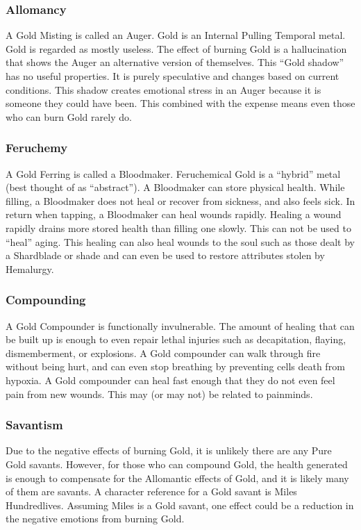 \documentclass[conference]{IEEEtran}
\begin{document}
\subsubsection*{\textbf{Allomancy}}
A Gold Misting is called an Auger.\cite{ARS}  Gold is an Internal Pulling Temporal metal.\cite{AL-TB}  Gold is regarded as mostly useless.  The effect of burning Gold is a hallucination that shows the Auger an alternative version of themselves.\cite{ARS}  This ``Gold shadow'' has no useful properties.  It is purely speculative and changes based on current conditions.\cite{gd-situation}  This shadow creates emotional stress in an Auger because it is someone they could have been.\cite{TFE-CH37}  This combined with the expense means even those who can burn Gold rarely do.\cite{TFE-CH37}\\
\subsubsection*{\textbf{Feruchemy}}
A Gold Ferring is called a Bloodmaker.\cite{ARS}  Feruchemical Gold is a ``hybrid'' metal (best thought of as ``abstract'').\cite{FE-TB} A Bloodmaker can store physical health.\cite{ARS}  While filling, a Bloodmaker does not heal or recover from sickness, and also feels sick.\cite{AoL-CH12}  In return when tapping, a Bloodmaker can heal wounds rapidly.  Healing a wound rapidly drains more stored health than filling one slowly.\cite{AoL-CH9}  This can not be used to ``heal'' aging.\cite{gd-age}  This healing can also heal wounds to the soul such as those dealt by a Shardblade\cite{gd-shard} or shade\cite{gd-shard} and can even be used to restore attributes stolen by Hemalurgy.\cite{gd-he}\\
\subsubsection*{\textbf{Compounding}}
A Gold Compounder is functionally invulnerable.  The amount of healing that can be built up is enough to even repair lethal injuries such as decapitation,\cite{gd-decap} flaying,\cite{TFE-CH38} dismemberment,\cite{TFE-CH38} or explosions.\cite{AoL-CH18}  A Gold compounder can walk through fire without being hurt,\cite{TFE-CH38} and can even stop breathing by preventing cells death from hypoxia.\cite{AoL-CH17}  A Gold compounder can heal fast enough that they do not even feel pain from new wounds.\cite{AoL-CH17} This may (or may not) be related to painminds.\cite{TLM-CH34}\\
\subsubsection*{\textbf{Savantism}}
Due to the negative effects of burning Gold, it is unlikely there are any Pure Gold savants.  However, for those who can compound Gold, the health generated is enough to compensate for the Allomantic effects of Gold, and it is likely many of them are savants.  A character reference for a Gold savant is Miles Hundredlives.\cite{miles-savant}  Assuming Miles is a Gold savant, one effect could be a reduction in the negative emotions from burning Gold.\cite{AoL-CH15}\\
\end{document}
